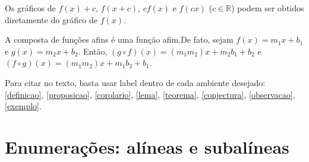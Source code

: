 \begin{remark}
  \label{observacao}
  Os gráficos de $f(x) + c$, $f(x + c)$, $cf(x)$ e $f(c x)$ ($c\in\mathds{R}$) 
  podem ser obtidos diretamente do gráfico de $f(x)$.
\end{remark}


\begin{example}
  \label{exemplo}
  A composta de funções afins é uma função afim.\newline De fato, sejam $f(x)=m_1x+b_1$ e
  $g(x)=m_2x+b_2$. Então, $(g\circ f)(x)=(m_1m_2)x+m_2b_1+b_2$ e 
  $(f\circ g)(x)=(m_1m_2)x+m_1b_2+b_1$.
\end{example}

Para citar no texto, basta usar \textsf{label} dentro de cada ambiente desejado:
\autoref{definicao}, \autoref{proposicao}, \autoref{corolario}, \autoref{lema},
\autoref{teorema}, \autoref{conjectura}, \autoref{observacao}, \autoref{exemplo}.

\section{Enumerações: alíneas e subalíneas}


